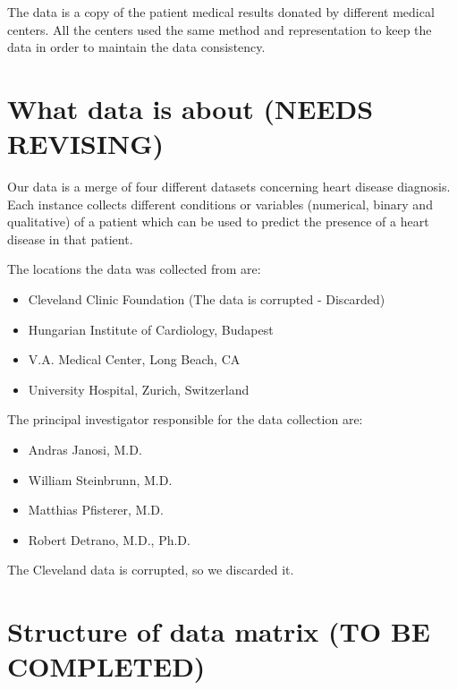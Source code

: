 \documentclass[a4paper,12pt]{article}
\begin{document}
    The data is a copy of the patient medical results donated by different medical centers. All the centers used the same method and representation to keep the data in order to maintain the data consistency.

\section{What data is about (\textbf{NEEDS REVISING})}

    Our data is a merge of four different datasets concerning heart disease diagnosis.
    Each instance collects different conditions or variables (numerical, binary and qualitative) of a patient
    which can be used to predict the presence of a heart disease in that patient.
    
    The locations the data was collected from are:

    \begin{itemize}

        \item Cleveland Clinic Foundation (The data is corrupted - Discarded)
        \item Hungarian Institute of Cardiology, Budapest
        \item V.A. Medical Center, Long Beach, CA
        \item University Hospital, Zurich, Switzerland

    \end{itemize}

    The principal investigator responsible for the data collection are:

    \begin{itemize}

        \item Andras Janosi, M.D.
        \item William Steinbrunn, M.D.
        \item Matthias Pfisterer, M.D.
        \item Robert Detrano, M.D., Ph.D.

    \end{itemize}

    The Cleveland data is corrupted, so we discarded it.

\section{Structure of data matrix (\textbf{TO BE COMPLETED})}
\end{document}
